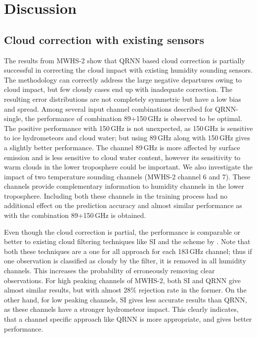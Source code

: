 \documentclass[amt, manuscript]{copernicus}
\begin{document}
\section{Discussion}
\label{discussions}

\subsection{Cloud correction with existing sensors}
%
The results from MWHS-2 show that QRNN based cloud correction is partially successful in correcting the cloud impact with existing humidity sounding sensors. The methodology can correctly address the large negative departures owing to cloud impact, but few cloudy cases end up with inadequate correction. The resulting error distributions are not completely symmetric but have a low bias and spread. Among several input channel combinations described for QRNN-single, the performance of combination 89+150\,GHz is observed to be optimal. The positive performance with 150\,GHz is not unexpected, as 150\,GHz is sensitive to ice hydrometeors and cloud water; but using 89\,GHz along with 150\,GHz gives a slightly better performance. The channel 89\,GHz is more affected by surface emission and is less sensitive to cloud water content, however its sensitivity to warm clouds in the lower troposphere could be important. We also investigate the impact of two temperature sounding channels (MWHS-2 channel 6 and 7). These channels provide complementary information to humidity channels in the lower troposphere. Including both these channels in the training process had no additional effect on the prediction accuracy and almost similar performance as with the combination 89+150\,GHz is obtained. 

Even though the cloud correction is partial, the performance is comparable or better to existing cloud filtering techniques like SI and the scheme by \cite{buehler:aclou:07}. Note that both these techniques are a one for all approach for each 183\,GHz channel; thus if one observation is classified as cloudy by the filter, it is removed in all humidity channels. This increases the probability of erroneously removing clear observations. For high peaking channels of MWHS-2, both SI and QRNN give almost similar results, but with almost 28\% rejection rate in the former. On the other hand, for low peaking channels, SI gives less accurate results than QRNN, as these channels have a stronger hydrometeor impact. This clearly indicates, that a channel specific approach like QRNN is more appropriate, and gives better performance. 
\end{document}
